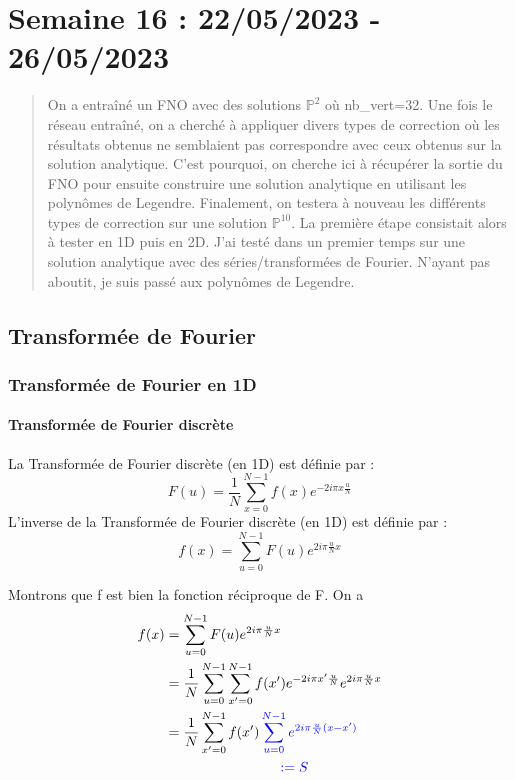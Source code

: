 \section{Semaine 16 : 22/05/2023 - 26/05/2023}
\graphicspath{{semaines/semaine_16/images/}}

\setcounter{equation}{0}

\begin{abstract}
	On a entraîné un FNO avec des solutions $\mathbb{P}^2$ où nb\_vert=32. Une fois le réseau entraîné, on a cherché à appliquer divers types de correction où les résultats obtenus ne semblaient pas correspondre avec ceux obtenus sur la solution analytique. C'est pourquoi, on cherche ici à récupérer la sortie du FNO pour ensuite construire une solution analytique en utilisant les polynômes de Legendre. Finalement, on testera à nouveau les différents types de correction sur une solution $\mathbb{P}^{10}$. La première étape consistait alors à tester en 1D puis en 2D. J'ai testé dans un premier temps sur une solution analytique avec des séries/transformées de Fourier. N'ayant pas aboutit, je suis passé aux polynômes de Legendre. 
\end{abstract}

\subsection{Transformée de Fourier}

\subsubsection{Transformée de Fourier en 1D}

\paragraph{Transformée de Fourier discrète \\}

\noindent La Transformée de Fourier discrète (en 1D) est définie par :
$$F(u)=\frac{1}{N}\sum_{x=0}^{N-1}f(x)e^{-2i\pi x\frac{u}{N}}$$
L'inverse de la Transformée de Fourier discrète (en 1D) est définie par :
$$f(x)=\sum_{u=0}^{N-1}F(u)e^{2i\pi \frac{u}{N}x}$$

Montrons que f est bien la fonction réciproque de F. On a 
\begin{align*}
	f(x)&=\sum_{u=0}^{N-1}F(u)e^{2i\pi \frac{u}{N}x} \\	
	&=\frac{1}{N}\sum_{u=0}^{N-1}\sum_{x'=0}^{N-1}f(x')e^{-2i\pi x'\frac{u}{N}}e^{2i\pi \frac{u}{N}x} \\
	&=\frac{1}{N}\sum_{x'=0}^{N-1}f(x')\color{blue}\sum_{u=0}^{N-1}e^{2i\pi \frac{u}{N}(x-x')}\color{black}\\
	& \qquad \qquad \qquad \qquad \color{blue}:= S \color{black}
\end{align*}

